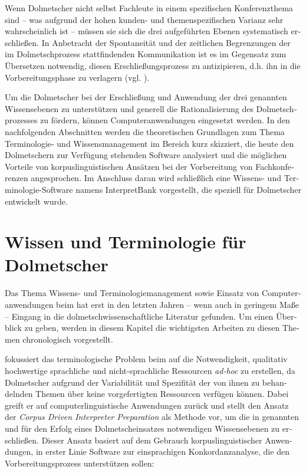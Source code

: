 \documentclass[output=paper]{LSP/langsci}
\begin{document}
\begin{otherlanguage}{ngerman}
Wenn Dolmetscher nicht selbst Fachleute in einem spezifischen Konferenzthema sind -- was aufgrund der hohen kunden- und themenspezifischen Varianz sehr wahrscheinlich ist -- müssen sie sich die drei aufgeführten Ebenen systematisch erschließen. In Anbetracht der Spontaneität und der zeitlichen Begrenzungen der im Dolmetschprozess stattfindenden Kommunikation ist es im Gegensatz zum Übersetzen notwendig, diesen Erschließungsprozess zu antizipieren, d.h. ihn in die Vorbereitungsphase zu verlagern (vgl. \citealt{Gile1995,Stoll2009,Will2009}).

Um die Dolmetscher bei der Erschließung und Anwendung der drei genannten Wissensebenen zu unterstützen und generell die Rationalisierung des Dolmetschprozesses zu fördern, können Computeranwendungen eingesetzt werden. In den nachfolgenden Abschnitten werden die theoretischen Grundlagen zum Thema Terminologie- und Wissensmanagement im Bereich  kurz skizziert, die heute den Dolmetschern zur Verfügung stehenden Software analysiert und die möglichen Vorteile von korpuslinguistischen Ansätzen bei der Vorbereitung von Fachkonferenzen angesprochen. Im Anschluss daran wird schließlich eine Wissens- und Terminologie-Software namens InterpretBank vorgestellt, die speziell für Dolmetscher entwickelt wurde.

\section{Wissen und Terminologie für Dolmetscher}\label{sec:fantinuoli:2}

Das Thema Wissens- und Terminologiemanagement sowie Einsatz von Computeranwendungen beim  hat erst in den letzten Jahren -- wenn auch in geringem Maße -- Eingang in die dolmetschwissenschaftliche Literatur gefunden. Um einen Überblick zu geben, werden in diesem Kapitel die wichtigsten Arbeiten zu diesen Themen chronologisch vorgestellt.

\citet{Fantinuoli2006} fokussiert das terminologische Problem beim  auf die Notwendigkeit, qualitativ hochwertige sprachliche und nicht-sprachliche Ressourcen \textit{ad-hoc} zu erstellen, da Dolmetscher aufgrund der Variabilität und Spezifität der von ihnen zu behandelnden Themen über keine vorgefertigten Ressourcen verfügen können. Dabei greift er auf computerlinguistische Anwendungen zurück und stellt den Ansatz der \textit{Corpus Driven Interpreter Preparation} als Methode vor, um die in  genannten und für den Erfolg eines Dolmetscheinsatzes notwendigen Wissensebenen zu erschließen. Dieser Ansatz basiert auf dem Gebrauch korpuslinguistischer Anwendungen, in erster Linie Software zur einsprachigen Konkordanzanalyse, die den Vorbereitungsprozess unterstützen sollen:


\end{otherlanguage}
\end{document}
